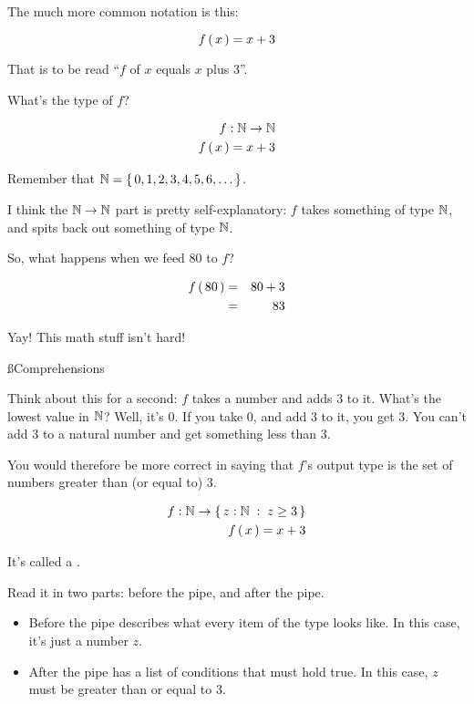 The much more common notation is this:

\begin{equation}
    f \left(\, x \,\right) = x + 3
\end{equation}

That is to be read ``$f$ of $x$ equals $x$ plus $3$''.

What's the type of $f$?

\begin{eqnarray}
    f : \mathbb{N} \to \mathbb{N} \\
    f \left(\, x \,\right) = x + 3 \\
\end{eqnarray}

Remember that $\mathbb{N} = \left\{\, 0,1,2,3,4,5,6,\dots \,\right\}$.

I think the $\mathbb{N} \to \mathbb{N}$ part is pretty self-explanatory: $f$ takes something of
type $\mathbb{N}$, and spits back out something of type $\mathbb{N}$.

So, what happens when we feed $80$ to $f$?

\begin{eqnarray}
    f \left(\, 80 \,\right) & = & 80 + 3 \\
                & = & 83 \\
\end{eqnarray}

Yay! This math stuff isn't hard!

\ss{Comprehensions}

Think about this for a second: $f$ takes a number and adds 3 to it. What's the
lowest value in $\mathbb{N}$? Well, it's $0$. If you take $0$, and add $3$ to it, you
get $3$. You can't add $3$ to a natural number and get something less than
$3$.

You would therefore be more correct in saying that $f$'s output type is the set
of numbers greater than (or equal to) $3$.

\begin{eqnarray}
    f : \mathbb{N} \to \left\{\, z : \mathbb{N}\; : \; z \ge 3 \,\right\} \\
    f \left(\, x \,\right) = x + 3 \\
\end{eqnarray}


It's called a .


Read it in two parts: before the pipe, and after the pipe.

\begin{itemize}
  \item Before the pipe describes what every item of the type looks like. In
    this case, it's just a number $z$.

  \item After the pipe has a list of conditions that must hold true. In this
    case, $z$ must be greater than or equal to $3$.
\end{itemize}

